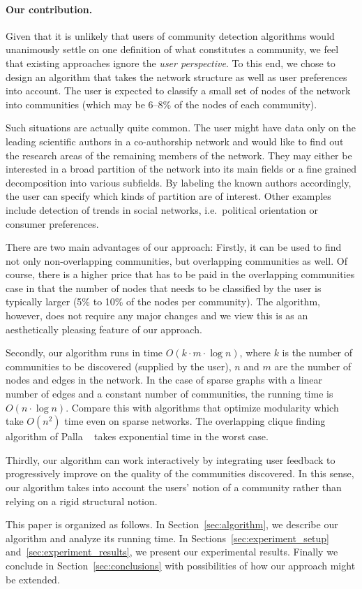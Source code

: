 \paragraph{Our contribution.}
Given that it is unlikely that users of community detection algorithms 
would unanimously settle on one definition of what constitutes a community, 
we feel that existing approaches ignore the \emph{user perspective}.
To this end, we chose to design an algorithm that takes the network structure 
as well as user preferences into account. 
The user is expected to classify a small set of nodes of the network 
into communities (which may be 6--8\% of the nodes of each community).

Such situations are actually quite common. The user might have data only on the
leading scientific authors in a co-authorship network and would like to find out
the research areas of the remaining members of the network.  They may either be
interested in a broad partition of the network into its main fields or a fine
grained decomposition into various subfields.  By labeling the known authors
accordingly, the user can specify which kinds of partition are of interest.
Other examples include detection of trends in social networks, i.e.~political 
orientation or consumer preferences.

There are two main advantages of our approach: Firstly, it can be used to find
not only non-overlapping communities, but overlapping communities as well. Of
course, there is a higher price that has to be paid in the overlapping
communities case in that the number of nodes that needs to be classified by the
user is typically larger (5\% to 10\% of the nodes per community). The
algorithm, however, does not require any major changes and we view this is as an
aesthetically pleasing feature of our approach.  

Secondly, our algorithm runs in time $O(k \cdot m \cdot \log n)$, where $k$ is 
the number of communities to be
discovered (supplied by the user), $n$ and $m$ are the number of nodes and edges
in the network. In the case of sparse graphs with a linear number of edges and a
constant number of communities, the running time is $O(n \cdot \log n)$.
Compare this with algorithms that optimize modularity which take $O(n^2)$ time
even on sparse networks. The overlapping clique finding algorithm of Palla
\etal~\cite{PDFV05} takes exponential time in the worst case.

Thirdly, our algorithm can work interactively by integrating user feedback  
to progressively improve on the quality of the communities discovered. In this sense, 
our algorithm takes into account the users' notion of a community rather than 
relying on a rigid structural notion.  

This paper is organized as follows. In Section~\ref{sec:algorithm}, we describe
our algorithm and analyze its running time. In
Sections~\ref{sec:experiment_setup} and~\ref{sec:experiment_results}, we present
our experimental results. Finally we conclude in Section~\ref{sec:conclusions}
with possibilities of how our approach might be extended. 



